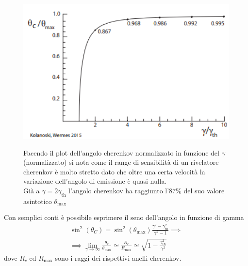 \hspace{-10pt}
\begin{minipage}{0.6\textwidth}
    
    \begin{figure}[H]
        \centering
        \includegraphics[width=1.01\textwidth,frame]{Chapters/images/Particle_identification/image-20220317114142322.png}
    \end{figure}
\end{minipage} \hspace{5pt}
\begin{minipage}{0.41\textwidth}
\vspace{9pt}
    \begin{figure}[H]
        \captionsetup{width=\textwidth}
        \caption{Facendo il plot dell'angolo cherenkov normalizzato in funzione del $\gamma$ (normalizzato) si nota come il range di sensibilità di un rivelatore cherenkov è molto stretto dato che oltre una certa velocità la variazione dell'angolo di emissione è quasi nulla.\\ Già a $\gamma=2 \gamma_\text{th}$ l'angolo cherenkov ha raggiunto l'87\% del suo valore asintotico $\theta_\text{max}$}
    \end{figure}


\end{minipage}
Con semplici conti è possibile esprimere il seno dell'angolo in funzione di gamma
\[\begin{gathered}
    \sin^2(\theta_C)=\sin^2(\theta_\text{max})\frac{\gamma^2-\gamma_\text{th}^2}{\gamma^2-1} \implies
\\ 
\implies \lim_{\gamma \to \infty} \frac{\theta_c}{\theta_\text{max}} \simeq \frac{R_c}{R_\text{max}} \simeq \sqrt{1-\frac{\gamma_\text{th}^2}{\gamma^2}}
\end{gathered}\]
dove $R_c$ ed $R_\text{max}$ sono i raggi dei rispettivi anelli cherenkov.

